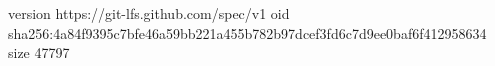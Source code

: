 version https://git-lfs.github.com/spec/v1
oid sha256:4a84f9395c7bfe46a59bb221a455b782b97dcef3fd6c7d9ee0baf6f412958634
size 47797
